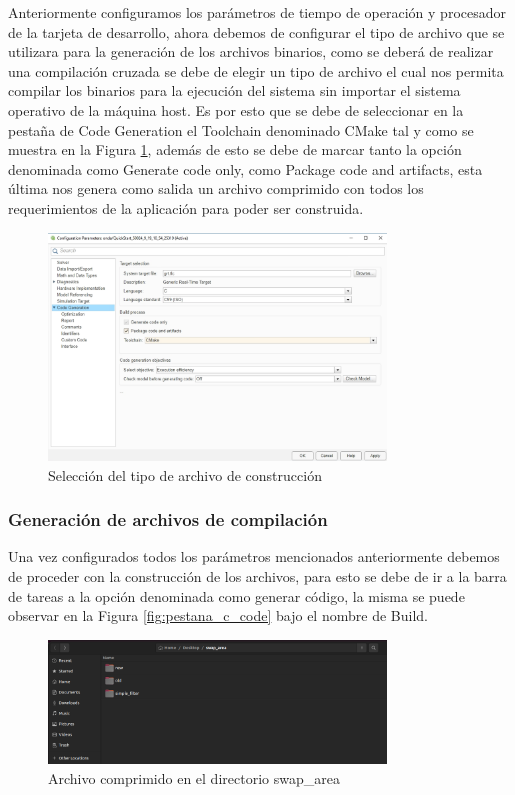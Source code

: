 Anteriormente configuramos los parámetros de tiempo de operación y procesador de la tarjeta de desarrollo, ahora debemos de configurar el tipo de archivo que se utilizara para la generación de los archivos binarios, como se deberá de realizar una compilación cruzada se debe de elegir un tipo de archivo el cual nos permita compilar los binarios para la ejecución del sistema sin importar el sistema operativo de la máquina host. Es por esto que se debe de seleccionar en la pestaña de Code Generation el Toolchain denominado CMake tal y como se muestra en la Figura \ref{fig:pestana_config_output_file}, además de esto se debe de marcar tanto la opción denominada como Generate code only, como Package code and artifacts, esta última nos genera como salida un archivo comprimido con todos los requerimientos de la aplicación para poder ser construida.


\begin{figure}[h!]
    \centering
    \includegraphics[width=0.8\textwidth]{fig/especifico_2/M2MT/paso_a_paso_mtmt/configuration_output_file.png}
    \caption{Selección del tipo de archivo de construcción}
    \label{fig:pestana_config_output_file}
\end{figure}

\subsubsection{Generación de archivos de compilación}

Una vez configurados todos los parámetros mencionados anteriormente debemos de proceder con la construcción de los archivos, para esto se debe de ir a la barra de tareas a la opción denominada como generar código, la misma se puede observar en la Figura \ref{fig:pestana_c_code} bajo el nombre de Build.

\begin{figure}[h!]
    \centering
    \includegraphics[width=0.8\textwidth]{fig/especifico_2/M2MT/paso_a_paso_mtmt/root_folder.png}
    \caption{Archivo comprimido en el directorio swap\_area}
    \label{fig:pestana_swap_area}
\end{figure}

